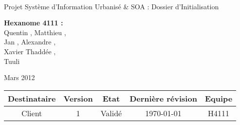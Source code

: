 \documentclass[a4paper]{article}
\begin{document}
\begin{titlepage}
~ 
\vfill
	\begin{center}
		\begin{Huge}
		Projet Système d'Information Urbanisé \& SOA : Dossier d'Initialisation\\ %
		\end{Huge} 
\vfill
		\textbf{Hexanome 4111 :} 
		\\Quentin {}, Matthieu , 
		\\Jan {}, Alexandre , 
		\\Xavier {}Thaddée ,
		\\Tuuli {}
\vfill		
		\begin{Large}
		Mars 2012
		\end{Large}
\vfill
	\begin{tabular}{|c|c|c|c|c|}
 	 \hline
   Destinataire & Version & Etat & Dernière révision & Equipe \\
   \hline
   Client & 1 & Validé & \today & H4111 \\
   \hline
	\end{tabular}
	\end{center}
\vfill
\end{titlepage}
\newpage
\tableofcontents
\newpage


\end{document}
